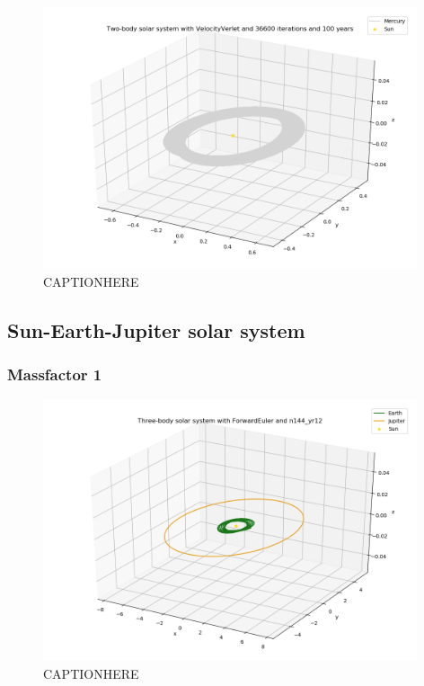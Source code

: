 \documentclass{article}
\begin{document}
    \begin{figure}[H]
        \centering
        \includegraphics[width = 11cm]{img/plot3D_S_M_V_n36600_yr100.png}
        \caption{CAPTIONHERE}
        \label{fig:plot3D_S_M_V_n36600_yr100}
    \end{figure}



\subsection{Sun-Earth-Jupiter solar system}

\subsubsection{Massfactor 1}

    \begin{figure}[H]
        \centering
        \includegraphics[width = 11cm]{img/plot3D_S_E_J_F_n144_yr12.png}
        \caption{CAPTIONHERE}
        \label{fig:plot3D_S_E_J_F_n144_yr12}
    \end{figure}
\end{document}
